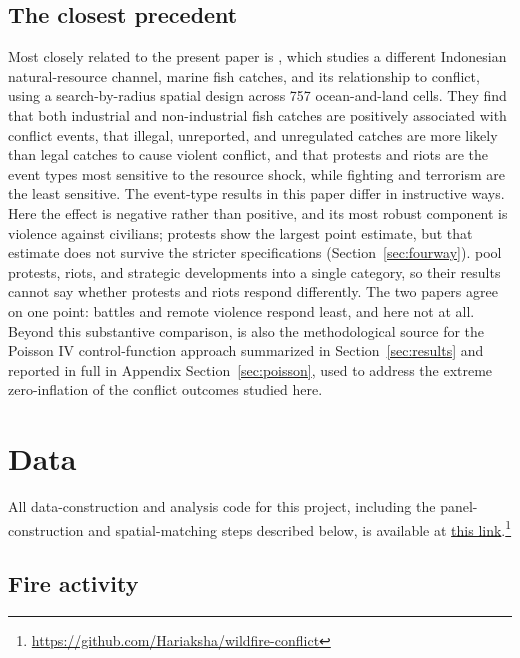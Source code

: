 \documentclass[12pt]{article}
\begin{document}
\subsection{The closest precedent}

Most closely related to the present paper is \citet{lu2023fish}, which studies a different Indonesian natural-resource channel, marine fish catches, and its relationship to conflict, using a search-by-radius spatial design across 757 ocean-and-land cells. They find that both industrial and non-industrial fish catches are positively associated with conflict events, that illegal, unreported, and unregulated catches are more likely than legal catches to cause violent conflict, and that protests and riots are the event types most sensitive to the resource shock, while fighting and terrorism are the least sensitive. The event-type results in this paper differ in instructive ways. Here the effect is negative rather than positive, and its most robust component is violence against civilians; protests show the largest point estimate, but that estimate does not survive the stricter specifications (Section~\ref{sec:fourway}). \citet{lu2023fish} pool protests, riots, and strategic developments into a single category, so their results cannot say whether protests and riots respond differently. The two papers agree on one point: battles and remote violence respond least, and here not at all. Beyond this substantive comparison, \citet{lu2023fish} is also the methodological source for the Poisson IV control-function approach summarized in Section~\ref{sec:results} and reported in full in Appendix Section~\ref{sec:poisson}, used to address the extreme zero-inflation of the conflict outcomes studied here.

\section{Data}
\label{sec:data}

All data-construction and analysis code for this project, including the panel-construction and spatial-matching steps described below, is available at \href{https://github.com/Hariaksha/wildfire-conflict}{this link}.\footnote{\url{https://github.com/Hariaksha/wildfire-conflict}}

\subsection{Fire activity}
\end{document}
